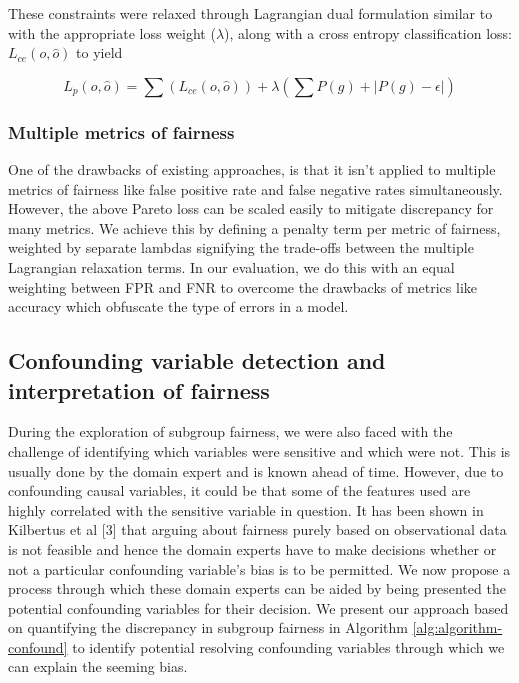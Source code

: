 These constraints were relaxed through Lagrangian dual formulation similar to \cite{Eban2016} with the appropriate loss weight ($\lambda$), along with a cross entropy classification loss: $L_{ce}(o, \hat{o})$ to yield

\[ L_{p}(o, \hat{o}) = \sum(L_{ce}(o, \hat{o})) + \lambda( \sum{P(g)} + |P(g) - \epsilon| ) \]

\subsubsection{Multiple metrics of fairness}
One of the drawbacks of existing approaches, is that it isn't applied to multiple metrics of fairness like false positive rate and false negative rates simultaneously. However, the above Pareto loss can be scaled easily to mitigate discrepancy for many metrics. We achieve this by defining a penalty term per metric of fairness, weighted by separate lambdas signifying the trade-offs between the multiple Lagrangian relaxation terms. In our evaluation, we do this with an equal weighting between FPR and FNR to overcome the drawbacks of metrics like accuracy which obfuscate the type of errors in a model.

\subsection{Confounding variable detection and interpretation of fairness}
During the exploration of subgroup fairness, we were also faced with the challenge of identifying which variables were sensitive and which were not. This is usually done by the domain expert and is known ahead of time. However, due to confounding causal variables, it could be that some of the features used are highly correlated with the sensitive variable in question. It has been shown in Kilbertus et al [3] that arguing about fairness purely based on observational data is not feasible and hence the domain experts have to make decisions whether or not a particular confounding variable's bias is to be permitted. We now propose a process through which these domain experts can be aided by being presented the potential confounding variables for their decision. We present our approach based on quantifying the discrepancy in subgroup fairness in Algorithm \ref{alg:algorithm-confound} to identify potential resolving confounding variables through which we can explain the seeming bias.
 
